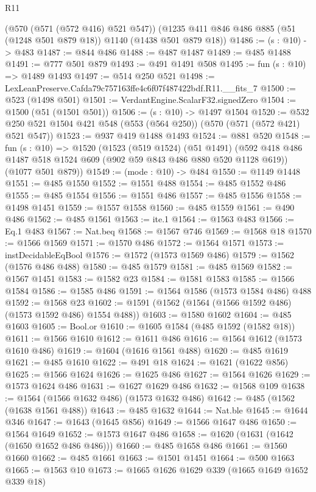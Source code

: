 \begin{lexlean}{R11}
\begin{coremodule}
    (@570 (@571 (@572 @416) @521 @547))
    (@1235 @411 @846 @486 @885 (@51 (@1248 @501 @879 @18)) @1140 (@1438 @501 @879 @18))
@1486 := (s : @10) -> @483
@1487 := @844 @486
@1488 := @487 @1487
@1489 := @485 @1488
@1491 := @777 @501 @879
@1493 := @491 @1491 @508
@1495 := fun (s : @10) => @1489 @1493
@1497 := @514 @250 @521
@1498 := LexLeanPreserve.Cafda79c757163ffe4c6f07f487422bdf.R11.__fits_7
@1500 := @523 (@1498 @501)
@1501 := VerdantEngine.ScalarF32.signedZero
@1504 := @1500 (@51 (@1501 @501))
@1506 := (s : @10) -> @1497 @1504
@1520 := @532 @250 @521 @1504 @421 @548 (@553 (@564 @250)) (@570 (@571 (@572 @421) @521 @547))
@1523 := @937 @419 @1488 @1493
@1524 := @881 @520
@1548 := fun (s : @10) =>
  @1520
    (@1523
      (@519 @1524)
      (@51 @1491)
      (@592 @418 @486 @1487 @518 @1524 @609 (@902 @59 @843 @486 @880 @520 @1128 @619))
      (@1077 @501 @879))
@1549 := (mode : @10) -> @484
@1550 := @1149 @1448
@1551 := @485 @1550
@1552 := @1551 @488
@1554 := @485 @1552 @486
@1555 := @485 @1554
@1556 := @1551 @486
@1557 := @485 @1556
@1558 := @1498 @1451
@1559 := @1557 @1558
@1560 := @485 @1559
@1561 := @490 @486
@1562 := @485 @1561
@1563 := ite.{1}
@1564 := @1563 @483
@1566 := Eq.{1} @483
@1567 := Nat.beq
@1568 := @1567 @746
@1569 := @1568 @18
@1570 := @1566 @1569
@1571 := @1570 @486
@1572 := @1564 @1571
@1573 := instDecidableEqBool
@1576 := @1572 (@1573 @1569 @486)
@1579 := @1562 (@1576 @486 @488)
@1580 := @485 @1579
@1581 := @485 @1569
@1582 := @1567 @1451
@1583 := @1582 @23
@1584 := @1581 @1583
@1585 := @1566 @1584
@1586 := @1585 @486
@1591 := @1564 @1586 (@1573 @1584 @486) @488
@1592 := @1568 @23
@1602 := @1591 (@1562 (@1564 (@1566 @1592 @486) (@1573 @1592 @486) @1554 @488))
@1603 := @1580 @1602
@1604 := @485 @1603
@1605 := Bool.or
@1610 := @1605 @1584 (@485 @1592 (@1582 @18))
@1611 := @1566 @1610
@1612 := @1611 @486
@1616 := @1564 @1612 (@1573 @1610 @486)
@1619 := @1604 (@1616 @1561 @488)
@1620 := @485 @1619
@1621 := @485 @1610
@1622 := @491 @18
@1624 := @1621 (@1622 @856)
@1625 := @1566 @1624
@1626 := @1625 @486
@1627 := @1564 @1626
@1629 := @1573 @1624 @486
@1631 := @1627 @1629 @486
@1632 := @1568 @109
@1638 := @1564 (@1566 @1632 @486) (@1573 @1632 @486)
@1642 := @485 (@1562 (@1638 @1561 @488))
@1643 := @485 @1632
@1644 := Nat.ble
@1645 := @1644 @346
@1647 := @1643 (@1645 @856)
@1649 := @1566 @1647 @486
@1650 := @1564 @1649
@1652 := @1573 @1647 @486
@1658 := @1620 (@1631 (@1642 (@1650 @1652 @486 @486)))
@1660 := @485 @1658 @486
@1661 := @1560 @1660
@1662 := @485 @1661
@1663 := @1501 @1451
@1664 := @500 @1663
@1665 := @1563 @10
@1673 := @1665 @1626 @1629 @339 (@1665 @1649 @1652 @339 @18)

\end{coremodule}
\end{lexlean}
